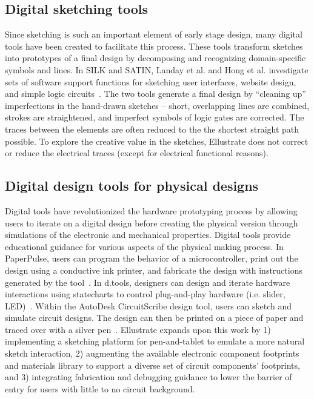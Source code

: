 \documentclass{sigchi}
\begin{document}
\subsection{Digital sketching tools} 
Since sketching is such an important element of early stage design, many digital tools have been created to facilitate this process. These tools transform sketches into prototypes of a final design by decomposing and recognizing domain-specific symbols and lines. In SILK and SATIN, Landay et al. and Hong et al. investigate sets of software support functions for sketching user interfaces, website design, and simple logic circuits~\cite{Hong:2007ta,Landay:1996wn}. The two tools generate a final design by ``cleaning up'' imperfections in the hand-drawn sketches -- short, overlapping lines are combined, strokes are straightened, and imperfect symbols of logic gates are corrected. The traces between the elements are often reduced to the the shortest straight path possible. To explore the creative value in the sketches, Ellustrate does not correct or reduce the electrical traces (except for electrical functional reasons). 


\subsection{Digital design tools for physical designs}
Digital tools have revolutionized the hardware prototyping process by allowing users to iterate on a digital design before creating the physical version through simulations of the electronic and mechanical properties. Digital tools provide educational guidance for various aspects of the physical making process. In PaperPulse, users can program the behavior of a microcontroller, print out the design using a conductive ink printer, and fabricate the design with instructions generated by the tool~\cite{RafRamakers:2015gb}. In d.tools, designers can design and iterate hardware interactions using statecharts to control plug-and-play hardware (i.e. slider, LED)~\cite{hartmann_reflective_2006}. Within the AutoDesk CircuitScribe design tool, users can sketch and simulate circuit designs. The design can then be printed on a piece of paper and traced over with a silver pen~\cite{_autodesk_2016}. Ellustrate expands upon this work by 1) implementing a sketching platform for pen-and-tablet to emulate a more natural sketch interaction, 2) augmenting the available electronic component footprints and materials library to support a diverse set of circuit components' footprints, and 3) integrating fabrication and debugging guidance to lower the barrier of entry for users with little to no circuit background.
\end{document}
